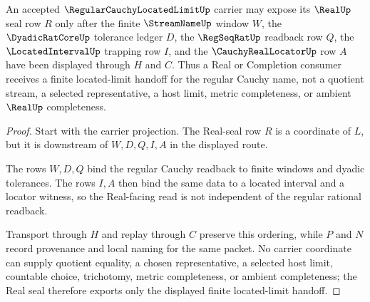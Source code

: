 \begin{theorem}
\label{thm:regular-cauchy-located-limit-real-handoff}
An accepted $\RegularCauchyLocatedLimitUp$ carrier may expose its $\RealUp$ seal row $R$ only after the finite $\StreamNameUp$ window $W$, the $\DyadicRatCoreUp$ tolerance ledger $D$, the $\RegSeqRatUp$ readback row $Q$, the $\LocatedIntervalUp$ trapping row $I$, and the $\CauchyRealLocatorUp$ row $A$ have been displayed through $H$ and $C$. Thus a Real or Completion consumer receives a finite located-limit handoff for the regular Cauchy name, not a quotient stream, a selected representative, a host limit, metric completeness, or ambient $\RealUp$ completeness.
\end{theorem}
\begin{proof}
Start with the carrier projection. The Real-seal row $R$ is a coordinate of $L$, but it is downstream of $W,D,Q,I,A$ in the displayed route.

The rows $W,D,Q$ bind the regular Cauchy readback to finite windows and dyadic tolerances. The rows $I,A$ then bind the same data to a located interval and a locator witness, so the Real-facing read is not independent of the regular rational readback.

Transport through $H$ and replay through $C$ preserve this ordering, while $P$ and $N$ record provenance and local naming for the same packet. No carrier coordinate can supply quotient equality, a chosen representative, a selected host limit, countable choice, trichotomy, metric completeness, or ambient completeness; the Real seal therefore exports only the displayed finite located-limit handoff.
\end{proof}




